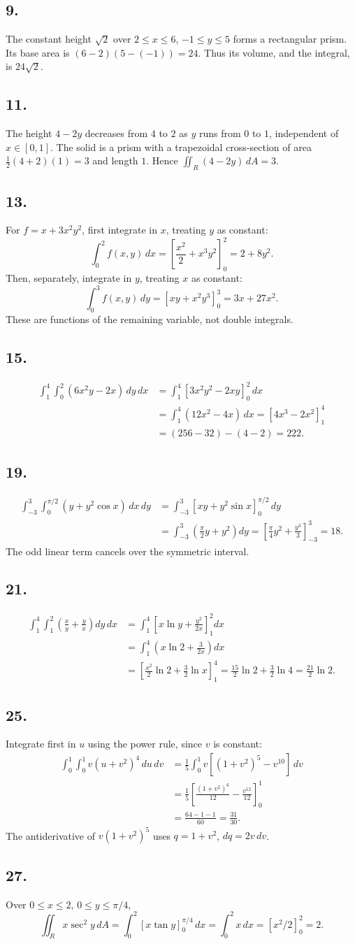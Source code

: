 \documentclass[11pt]{article}
\newcommand{\ex}[1]{\subsection*{#1.}}
\newcommand{\ans}[1]{\boxed{#1}}
\begin{document}
\ex{9}
The constant height $\sqrt2$ over $2\le x\le6$, $-1\le y\le5$ forms a rectangular prism. Its base area is $(6-2)(5-(-1))=24$. Thus its volume, and the integral, is $\ans{24\sqrt2}$.
\ex{11}
The height $4-2y$ decreases from $4$ to $2$ as $y$ runs from $0$ to $1$, independent of $x\in[0,1]$. The solid is a prism with a trapezoidal cross-section of area $\tfrac12(4+2)(1)=3$ and length $1$. Hence $\ans{\iint_R(4-2y)\,dA=3}$.
\ex{13}
For $f=x+3x^2y^2$, first integrate in $x$, treating $y$ as constant:
\[\ans{\int_0^2f(x,y)\,dx=\left[\frac{x^2}{2}+x^3y^2\right]_0^2=2+8y^2}.\]
Then, separately, integrate in $y$, treating $x$ as constant:
\[\ans{\int_0^3f(x,y)\,dy=[xy+x^2y^3]_0^3=3x+27x^2}.\]
These are functions of the remaining variable, not double integrals.
\ex{15}
\begin{align*}
\int_1^4\int_0^2(6x^2y-2x)\,dy\,dx
&=\int_1^4[3x^2y^2-2xy]_0^2\,dx\\
&=\int_1^4(12x^2-4x)\,dx=[4x^3-2x^2]_1^4\\
&=(256-32)-(4-2)=\ans{222}.
\end{align*}
\ex{19}
\begin{align*}
\int_{-3}^3\int_0^{\pi/2}(y+y^2\cos x)\,dx\,dy
&=\int_{-3}^3[xy+y^2\sin x]_0^{\pi/2}\,dy\\
&=\int_{-3}^3\left(\frac\pi2y+y^2\right)dy
=\left[\frac\pi4y^2+\frac{y^3}{3}\right]_{-3}^3=\ans{18}.
\end{align*}
The odd linear term cancels over the symmetric interval.
\ex{21}
\begin{align*}
\int_1^4\int_1^2\left(\frac xy+\frac yx\right)dy\,dx
&=\int_1^4\left[x\ln y+\frac{y^2}{2x}\right]_1^2dx\\
&=\int_1^4\left(x\ln2+\frac3{2x}\right)dx\\
&=\left[\frac{x^2}{2}\ln2+\frac32\ln x\right]_1^4
=\frac{15}2\ln2+\frac32\ln4=\ans{\frac{21}2\ln2}.
\end{align*}
\ex{25}
Integrate first in $u$ using the power rule, since $v$ is constant:
\begin{align*}
\int_0^1\int_0^1v(u+v^2)^4\,du\,dv
&=\frac15\int_0^1v[(1+v^2)^5-v^{10}]\,dv\\
&=\frac15\left[\frac{(1+v^2)^6}{12}-\frac{v^{12}}{12}\right]_0^1\\
&=\frac{64-1-1}{60}=\ans{\frac{31}{30}}.
\end{align*}
The antiderivative of $v(1+v^2)^5$ uses $q=1+v^2$, $dq=2v\,dv$.
\ex{27}
Over $0\le x\le2$, $0\le y\le\pi/4$,
\[\iint_R x\sec^2y\,dA=\int_0^2[x\tan y]_0^{\pi/4}\,dx
=\int_0^2x\,dx=[x^2/2]_0^2=\ans{2}.\]
\end{document}
